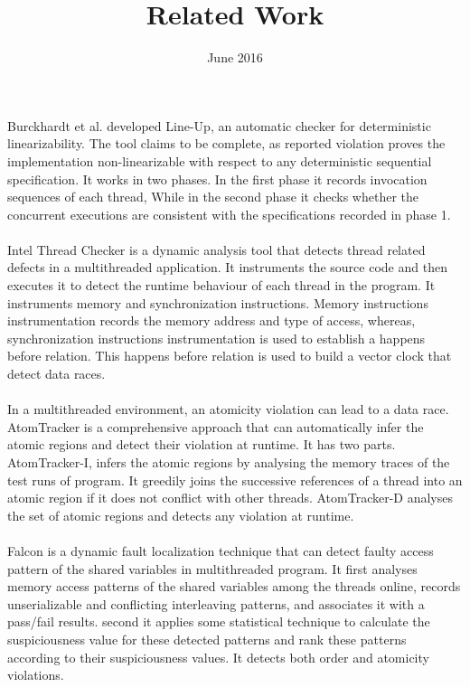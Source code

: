 \documentclass[12pt]{extarticle}
\title{\large \textbf{Related Work}}
\date{June 2016}
\begin{document}
\maketitle
Burckhardt et al. developed Line-Up\cite{burckhardt2010line}, an automatic checker for deterministic linearizability. The tool claims to be complete, as reported violation proves the implementation non-linearizable with respect to any deterministic sequential specification. It works in two phases. In the first phase it records invocation sequences of each thread, While in the second phase it checks whether the concurrent executions are consistent with the specifications recorded in phase 1. 

\paragraph{}
Intel Thread Checker\cite{Banerjee06unravelingdata} is a dynamic analysis tool that detects thread related defects in a multithreaded application. It instruments the source code and then executes it to detect the runtime behaviour of each thread in the program. It instruments memory and synchronization instructions. Memory instructions instrumentation records the memory address and type of access, whereas, synchronization instructions instrumentation is used to establish a happens before relation. This happens before relation is used to build a vector clock that detect data races.


\paragraph{}
In a multithreaded environment, an atomicity violation can lead to a data race. AtomTracker\cite{muzahid2010atomtracker} is a comprehensive approach that can automatically infer the atomic regions and detect their violation at runtime.  It has two parts. AtomTracker-I, infers the atomic regions by analysing the memory traces of the test runs of program. It greedily joins the successive references of a thread into an atomic region if it does not conflict with other threads. AtomTracker-D analyses the set of atomic regions and detects any violation at runtime.   


\paragraph{}
Falcon\cite{park2010falcon} is a dynamic fault localization technique that can detect faulty access pattern of the shared variables in multithreaded program. It first analyses memory access patterns of the shared variables among the threads online, records unserializable and conflicting interleaving patterns, and associates it with a pass/fail results. second  it applies some statistical technique to calculate the suspiciousness value for these detected patterns and rank these patterns according to their suspiciousness values. It detects both order and atomicity violations.
\end{document}
